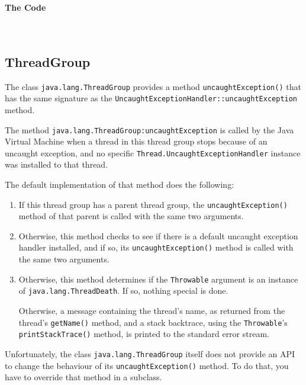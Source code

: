 \documentclass[11pt,a4paper, titlepage, parskip=half, headsepline, footsepline, cleardoublepage=current, headheight=1cm]{scrbook}
\begin{document}
\paragraph{The Code} \


\subsection{ThreadGroup}\label{sec:ThreadGroup}
The class \lstinline|java.lang.ThreadGroup|\autocite{ORACLE_DOC_THREADGROUP_CLASS} provides a method \lstinline|uncaughtException()| that has the same signature as the \lstinline|UncaughtExceptionHandler::uncaughtException|\autocite{ORACLE_DOC_UNCAUGHTEXCEPTIONHANDLER:uncaughtException} method.

The method \lstinline|java.lang.ThreadGroup:uncaughtException| is called by the Java Virtual Machine when a thread in this thread group stops because of an uncaught exception, and no specific \lstinline|Thread.UncaughtExceptionHandler|\autocite{ORACLE_DOC_UNCAUGHTEXCEPTIONHANDLER_INTERFACE} instance was installed
to that thread.

The default implementation of that method does the following:
\begin{enumerate}
\item{If this thread group has a parent thread group, the \lstinline|uncaughtException()| method of that parent is called with the same two arguments.}
\item{Otherwise, this method checks to see if there is a default uncaught exception handler installed, and if so, its \lstinline|uncaughtException()| method is called with the same two arguments.}
\item{Otherwise, this method determines if the \lstinline|Throwable| argument is an instance of \lstinline|java.lang.ThreadDeath|. If so, nothing special is done.

Otherwise, a message containing the thread's name, as returned from the thread's \lstinline|getName()| method, and a stack backtrace, using the \lstinline|Throwable|'s \lstinline|printStackTrace()| method, is printed to the standard error stream.}
\end{enumerate}

Unfortunately, the class \lstinline|java.lang.ThreadGroup| itself does not provide an API to change the behaviour of its \lstinline|uncaughtException()| method. To do that, you have to override that method in a subclass.
\end{document}
